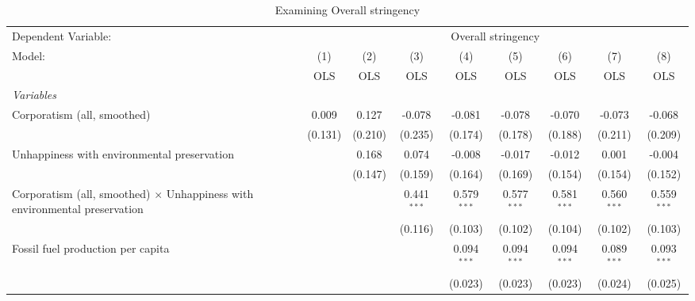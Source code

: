 
\begin{table}[htbp]
   \caption{Examining Overall stringency}
   \centering
   \begin{tabular}{lcccccccc}
      \toprule
      Dependent Variable: & \multicolumn{8}{c}{Overall stringency}\\
      Model:                                                                            & (1)     & (2)     & (3)           & (4)           & (5)           & (6)           & (7)           & (8)\\  
                                                                                        &  OLS    & OLS     & OLS           & OLS           & OLS           & OLS           & OLS           & OLS\\  
      \midrule
      \emph{Variables}\\
      Corporatism (all, smoothed)                                                       & 0.009   & 0.127   & -0.078        & -0.081        & -0.078        & -0.070        & -0.073        & -0.068\\   
                                                                                        & (0.131) & (0.210) & (0.235)       & (0.174)       & (0.178)       & (0.188)       & (0.211)       & (0.209)\\   
      Unhappiness with environmental preservation                                       &         & 0.168   & 0.074         & -0.008        & -0.017        & -0.012        & 0.001         & -0.004\\   
                                                                                        &         & (0.147) & (0.159)       & (0.164)       & (0.169)       & (0.154)       & (0.154)       & (0.152)\\   
      Corporatism (all, smoothed) $\times$ Unhappiness with environmental preservation  &         &         & 0.441$^{***}$ & 0.579$^{***}$ & 0.577$^{***}$ & 0.581$^{***}$ & 0.560$^{***}$ & 0.559$^{***}$\\   
                                                                                        &         &         & (0.116)       & (0.103)       & (0.102)       & (0.104)       & (0.102)       & (0.103)\\   
      Fossil fuel production per capita                                                 &         &         &               & 0.094$^{***}$ & 0.094$^{***}$ & 0.094$^{***}$ & 0.089$^{***}$ & 0.093$^{***}$\\   
                                                                                        &         &         &               & (0.023)       & (0.023)       & (0.023)       & (0.024)       & (0.025)\\   

\end{tabular}
\end{table}
